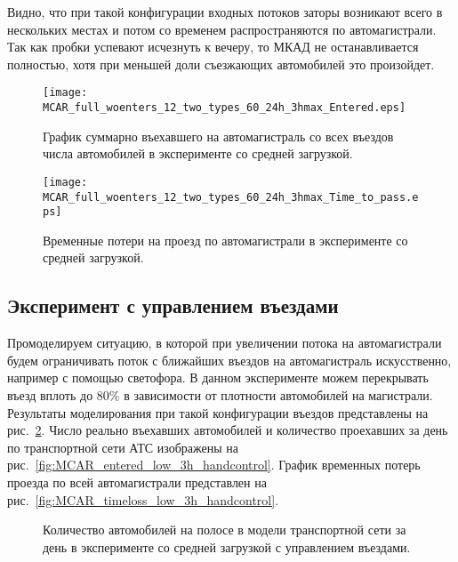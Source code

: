 Видно, что при такой конфигурации входных потоков заторы возникают всего в нескольких местах и потом со временем распространяются по автомагистрали.
Так как пробки успевают исчезнуть к вечеру, то МКАД не останавливается полностью, хотя при меньшей доли съезжающих автомобилей это произойдет.
\begin{figure}[ht]
    \begin{minipage}[b][][b]{0.49\textwidth}
        \centering
        \texttt{[image: MCAR\_full\_woenters\_12\_two\_types\_60\_24h\_3hmax\_Entered.eps]}
        \caption{График суммарно въехавшего на автомагистраль со всех въездов числа автомобилей в эксперименте со средней загрузкой.}
        \label{fig:MCAR_entered_low_3h}
    \end{minipage}
    \hfill
    \begin{minipage}[b][][b]{0.49\textwidth}
        \centering
        \texttt{[image: MCAR\_full\_woenters\_12\_two\_types\_60\_24h\_3hmax\_Time\_to\_pass.eps]}
        \caption{Временные потери на проезд по автомагистрали в эксперименте со средней загрузкой.}
        \label{fig:MCAR_timeloss_low_3h}
    \end{minipage}
\end{figure}


\subsection{Эксперимент с управлением въездами}
Промоделируем ситуацию, в которой при увеличении потока на автомагистрали будем ограничивать поток с ближайших въездов на автомагистраль искусственно, например с помощью светофора.
В данном эксперименте можем перекрывать въезд вплоть до 80\% в зависимости от плотности автомобилей на магистрали.
Результаты моделирования при такой конфигурации въездов представлены на рис.~\ref{fig:MCAR_heatmap_low_3h_handcontrol}.
Число реально въехавших автомобилей и количество проехавших за день по транспортной сети АТС изображены на рис.~\ref{fig:MCAR_entered_low_3h_handcontrol}.
График временных потерь проезда по всей автомагистрали представлен на рис.~\ref{fig:MCAR_timeloss_low_3h_handcontrol}.
\begin{figure}[ht]
    \caption{Количество автомобилей на полосе в модели транспортной сети за день в эксперименте со средней загрузкой с управлением въездами.}
    \label{fig:MCAR_heatmap_low_3h_handcontrol}
\end{figure}

